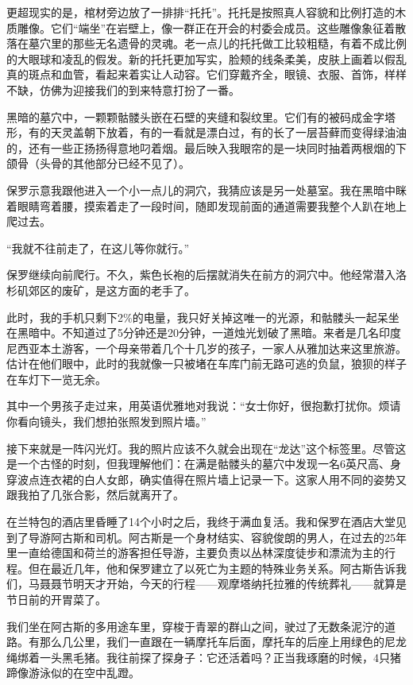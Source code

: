\documentclass[12pt,oneside]{book}
\begin{document}
更超现实的是，棺材旁边放了一排排“托托”。托托是按照真人容貌和比例打造的木质雕像。它们“端坐”在岩壁上，像一群正在开会的村委会成员。这些雕像象征着散落在墓穴里的那些无名遗骨的灵魂。老一点儿的托托做工比较粗糙，有着不成比例的大眼球和凌乱的假发。新的托托更加写实，脸颊的线条柔美，皮肤上画着以假乱真的斑点和血管，看起来着实让人动容。它们穿戴齐全，眼镜、衣服、首饰，样样不缺，仿佛为迎接我们的到来特意打扮了一番。

黑暗的墓穴中，一颗颗骷髅头嵌在石壁的夹缝和裂纹里。它们有的被码成金字塔形，有的天灵盖朝下放着，有的一看就是漂白过，有的长了一层苔藓而变得绿油油的，还有一些正扬扬得意地叼着烟。最后映入我眼帘的是一块同时抽着两根烟的下颌骨（头骨的其他部分已经不见了）。

保罗示意我跟他进入一个小一点儿的洞穴，我猜应该是另一处墓室。我在黑暗中眯着眼睛弯着腰，摸索着走了一段时间，随即发现前面的通道需要我整个人趴在地上爬过去。

“我就不往前走了，在这儿等你就行。”

保罗继续向前爬行。不久，紫色长袍的后摆就消失在前方的洞穴中。他经常潜入洛杉矶郊区的废矿，是这方面的老手了。

此时，我的手机只剩下2\%的电量，我只好关掉这唯一的光源，和骷髅头一起呆坐在黑暗中。不知道过了5分钟还是20分钟，一道烛光划破了黑暗。来者是几名印度尼西亚本土游客，一个母亲带着几个十几岁的孩子，一家人从雅加达来这里旅游。估计在他们眼中，此时的我就像一只被堵在车库门前无路可逃的负鼠，狼狈的样子在车灯下一览无余。

其中一个男孩子走过来，用英语优雅地对我说：“女士你好，很抱歉打扰你。烦请你看向镜头，我们想拍张照发到照片墙。”

接下来就是一阵闪光灯。我的照片应该不久就会出现在“龙达”这个标签里。尽管这是一个古怪的时刻，但我理解他们：在满是骷髅头的墓穴中发现一名6英尺高、身穿波点连衣裙的白人女郎，确实值得在照片墙上记录一下。这家人用不同的姿势又跟我拍了几张合影，然后就离开了。

在兰特包的酒店里昏睡了14个小时之后，我终于满血复活。我和保罗在酒店大堂见到了导游阿古斯和司机。阿古斯是一个身材结实、容貌俊朗的男人，在过去的25年里一直给德国和荷兰的游客担任导游，主要负责以丛林深度徒步和漂流为主的行程。但在最近几年，他和保罗建立了以死亡为主题的特殊业务关系。阿古斯告诉我们，马聂聂节明天才开始，今天的行程——观摩塔纳托拉雅的传统葬礼——就算是节日前的开胃菜了。

我们坐在阿古斯的多用途车里，穿梭于青翠的群山之间，驶过了无数条泥泞的道路。有那么几公里，我们一直跟在一辆摩托车后面，摩托车的后座上用绿色的尼龙绳绑着一头黑毛猪。我往前探了探身子：它还活着吗？正当我琢磨的时候，4只猪蹄像游泳似的在空中乱蹬。
\end{document}
